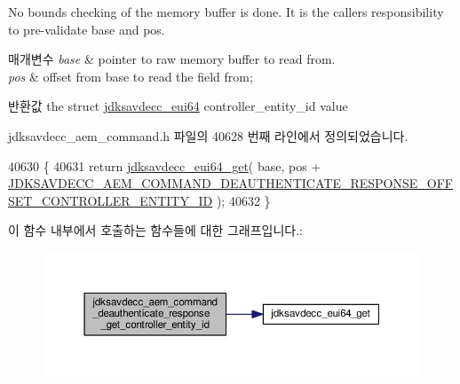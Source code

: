 No bounds checking of the memory buffer is done. It is the caller\textquotesingle{}s responsibility to pre-\/validate base and pos.


\begin{DoxyParams}{매개변수}
{\em base} & pointer to raw memory buffer to read from. \\
\hline
{\em pos} & offset from base to read the field from; \\
\hline
\end{DoxyParams}
\begin{DoxyReturn}{반환값}
the struct \hyperlink{structjdksavdecc__eui64}{jdksavdecc\+\_\+eui64} controller\+\_\+entity\+\_\+id value 
\end{DoxyReturn}


jdksavdecc\+\_\+aem\+\_\+command.\+h 파일의 40628 번째 라인에서 정의되었습니다.


\begin{DoxyCode}
40630 \{
40631     \textcolor{keywordflow}{return} \hyperlink{group__eui64_ga2652311a25a6b91cddbed75c108c7031}{jdksavdecc\_eui64\_get}( base, pos + 
      \hyperlink{group__command__deauthenticate__response_gaf791b1b27501b3c78e5e477648b04980}{JDKSAVDECC\_AEM\_COMMAND\_DEAUTHENTICATE\_RESPONSE\_OFFSET\_CONTROLLER\_ENTITY\_ID}
       );
40632 \}
\end{DoxyCode}


이 함수 내부에서 호출하는 함수들에 대한 그래프입니다.\+:
\nopagebreak
\begin{figure}[H]
\begin{center}
\leavevmode
\includegraphics[width=350pt]{group__command__deauthenticate__response_gaf28a100f0a748334ae44c693db86a3af_cgraph}
\end{center}
\end{figure}



